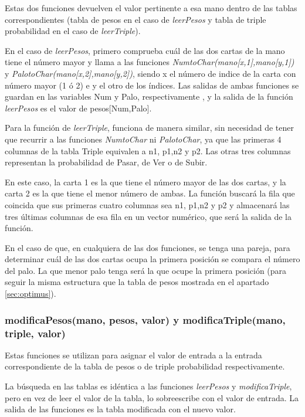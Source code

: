 Estas dos funciones devuelven el valor pertinente a esa mano dentro de las tablas correspondientes (tabla de pesos en el caso de \textit{leerPesos} y tabla de triple probabilidad en el  caso de \textit{leerTriple}).

En el caso de \textit{leerPesos}, primero comprueba cuál de las dos cartas de la mano tiene el número mayor y llama a las funciones \textit{NumtoChar(mano[x,1],mano[y,1])} y \textit{PalotoChar(mano[x,2],mano[y,2])}, siendo x el número de indice de la carta con número mayor (1 ó 2) e y el otro de los índices. Las salidas de ambas funciones se guardan en las variables Num y Palo, respectivamente , y la salida de la función \textit{leerPesos} es el valor de pesos[Num,Palo].

Para la función de \textit{leerTriple}, funciona de manera similar, sin necesidad de tener que recurrir a las funciones \textit{NumtoChar} ni \textit{PalotoChar}, ya que las primeras 4 columnas de la tabla Triple equivalen a n1, p1,n2 y p2. Las otras tres columnas representan la probabilidad de Pasar, de Ver o de Subir.

En este caso, la carta 1 es la que tiene el número mayor de las dos cartas, y la carta 2 es la que tiene el menor número de ambas. La función buscará la fila que coincida que sus primeras cuatro columnas sea n1, p1,n2 y p2 y almacenará las tres últimas columnas de esa fila en un vector numérico, que será la salida de la función.

En el caso de que, en cualquiera de las dos funciones, se tenga una pareja, para determinar cuál de las dos cartas ocupa la primera posición se compara el número del palo. La que menor palo tenga será la que ocupe la primera posición (para seguir la misma estructura que la tabla de pesos mostrada en el apartado \ref{sec:optimus}).

\subsubsection{modificaPesos(mano, pesos, valor) y modificaTriple(mano, triple, valor)}

Estas funciones se utilizan para asignar el valor de entrada a la entrada correspondiente de la tabla de pesos o de triple probabilidad respectivamente.

La búsqueda en las tablas es idéntica a las funciones \textit{leerPesos} y \textit{modificaTriple}, pero en vez de leer el valor de la tabla, lo sobreescribe con el valor de entrada. La salida de las funciones es la tabla modificada con el nuevo valor.
